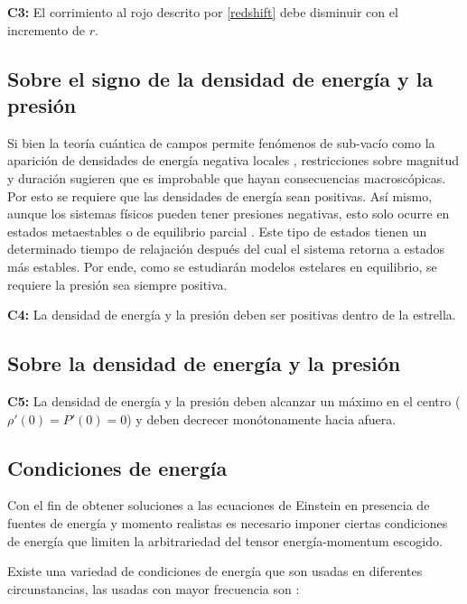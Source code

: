 \textbf{C3:} El corrimiento al rojo descrito por \eqref{redshift} debe disminuir con el incremento de $r$.
\subsection*{Sobre el signo de la densidad de energía y la presión}
Si bien la teoría cuántica de campos permite fenómenos de sub-vacío como la aparición de densidades de energía negativa locales \cite{Ford2010}, restricciones sobre magnitud y duración sugieren que es improbable que hayan consecuencias macroscópicas. Por esto se requiere que las densidades de energía sean positivas.
Así mismo, aunque los sistemas físicos pueden tener presiones negativas, esto solo ocurre en estados metaestables o de equilibrio parcial \cite{Landau1980}. Este tipo de estados tienen un determinado tiempo de relajación después del cual el sistema retorna a estados más estables. Por ende, como se estudiarán modelos estelares en equilibrio, se requiere la presión sea siempre positiva. 

\textbf{C4:} La densidad de energía y la presión deben ser positivas dentro de la estrella. 

\subsection*{Sobre la densidad de energía y la presión}
\textbf{C5:} La densidad de energía y la presión deben alcanzar un máximo en el centro ($\rho'(0)=P'(0)=0$) y deben decrecer monótonamente hacia afuera.

\subsection*{Condiciones de energía}
Con el fin de obtener soluciones a las ecuaciones de Einstein en presencia de fuentes de energía y momento realistas es necesario imponer ciertas condiciones de energía que limiten la arbitrariedad del tensor energía-momentum escogido.

Existe una variedad de condiciones de energía que son usadas en diferentes circunstancias, las usadas con mayor frecuencia son \cite{Hawking1973,Carroll2003}:

